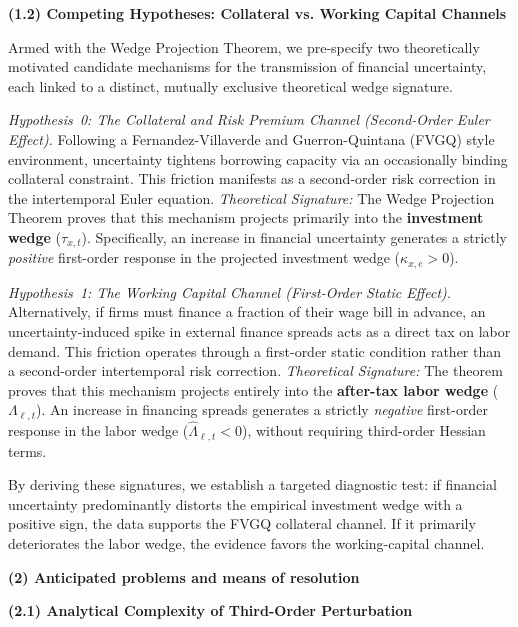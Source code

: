 \bigskip

\noindent\textbf{(1.2) Competing Hypotheses: Collateral vs. Working Capital Channels}

\medskip

Armed with the Wedge Projection Theorem, we pre-specify two theoretically motivated candidate mechanisms for the transmission of financial uncertainty, each linked to a distinct, mutually exclusive theoretical wedge signature.

\noindent\textit{Hypothesis~0: The Collateral and Risk Premium Channel (Second-Order Euler Effect).} 
Following a Fernandez-Villaverde and Guerron-Quintana (FVGQ) style environment, uncertainty tightens borrowing capacity via an occasionally binding collateral constraint. This friction manifests as a second-order risk correction in the intertemporal Euler equation. 
\emph{Theoretical Signature:} The Wedge Projection Theorem proves that this mechanism projects primarily into the \textbf{investment wedge} ($\tau_{x,t}$). Specifically, an increase in financial uncertainty generates a strictly \emph{positive} first-order response in the projected investment wedge ($\kappa_{x,e} > 0$).

\noindent\textit{Hypothesis~1: The Working Capital Channel (First-Order Static Effect).} 
Alternatively, if firms must finance a fraction of their wage bill in advance, an uncertainty-induced spike in external finance spreads acts as a direct tax on labor demand. This friction operates through a first-order static condition rather than a second-order intertemporal risk correction.
\emph{Theoretical Signature:} The theorem proves that this mechanism projects entirely into the \textbf{after-tax labor wedge} ($\Lambda_{\ell,t}$). An increase in financing spreads generates a strictly \emph{negative} first-order response in the labor wedge ($\hat\Lambda_{\ell,t} < 0$), without requiring third-order Hessian terms.

By deriving these signatures, we establish a targeted diagnostic test: if financial uncertainty predominantly distorts the empirical investment wedge with a positive sign, the data supports the FVGQ collateral channel. If it primarily deteriorates the labor wedge, the evidence favors the working-capital channel.

\bigskip

\noindent\textbf{(2) Anticipated problems and means of resolution}

\bigskip

\noindent\textbf{(2.1) Analytical Complexity of Third-Order Perturbation}

